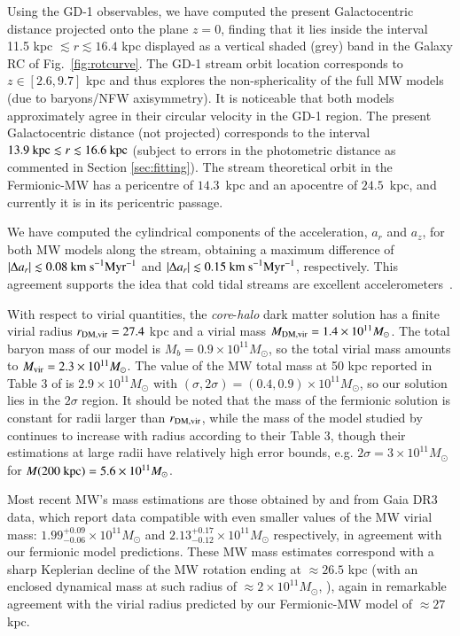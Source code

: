 \documentclass[twocolumn]{aa}
\begin{document}
Using the GD-1 observables, we have computed the present Galactocentric distance projected onto the plane $z=0$, finding that it lies inside the interval 11.5 kpc $\lesssim r \lesssim 16.4$ kpc displayed as a vertical shaded (grey) band in the Galaxy RC of Fig.~\ref{fig:rotcurve}. The GD-1 stream orbit location corresponds to $z\in [2.6, 9.7]$ kpc and thus explores the non-sphericality of the full MW models (due to baryons/NFW axisymmetry).
It is noticeable that both models approximately agree in their circular velocity in the GD-1 region.
The present Galactocentric distance (not projected) corresponds to the interval $13.9~\textrm{kpc} \lesssim r \lesssim 16.6~\rm{kpc}$ (subject to errors in the photometric distance as commented in Section \ref{sec:fitting}). The stream theoretical orbit in the Fermionic-MW has a pericentre of $14.3$~kpc and an apocentre of $24.5$~kpc, and currently it is in its pericentric passage.

We have computed the cylindrical components of the acceleration, $a_r$ and $a_z$,
for both MW models along the stream, obtaining a maximum difference of $|\Delta a_r| \lesssim 0.08 \rm{~km~s}^{-1} \rm{Myr}^{-1}$ and $|\Delta a_r| \lesssim 0.15 \rm{~km~s}^{-1} \rm{Myr}^{-1}$, respectively. This agreement supports  the idea that cold tidal streams are excellent accelerometers~\citep{Ibata_2016,2022ApJ...940...22N,2023ApJ...945L..32C}.

With respect to virial quantities, the \textit{core}-\textit{halo} dark matter solution has a finite virial radius $r_{\rm{DM,vir}}=27.4$ kpc and a virial mass
$M_{\rm{DM,vir}}=1.4\times10^{11} M_\odot$. The total baryon mass of our model is $M_b=0.9\times10^{11}M_\odot$, so the total virial mass amounts to
$M_{\rm{vir}}=2.3\times10^{11} M_\odot$. The value of the MW total mass at 50 kpc reported in Table 3
of \citet{2014MNRAS.445.3788G} is $2.9\times10^{11} M_\odot$ with $(\sigma, 2\sigma)=(0.4,0.9)\times10^{11} M_\odot$, so our solution lies in the $2\sigma$ region.
It should be noted that the mass of the fermionic solution is constant for radii larger than
$r_{\rm{DM,vir}}$, while the mass of the model studied by \citet{2014MNRAS.445.3788G} continues to increase with radius according to their Table 3, though their estimations at large radii have relatively
high error bounds, e.g. $2\sigma=3\times10^{11} M_\odot$ for $M(200 \hbox{ kpc}) =5.6\times10^{11} M_\odot$.

Most recent MW's mass estimations are those obtained by
\citet{Jiao2023} and \citet{Ou2023} from Gaia DR3 data, which report data compatible with even smaller values of the MW virial mass: $1.99^{+0.09}_{-0.06}\times10^{11} M_\odot$ and $2.13^{+0.17}_{-0.12}\times10^{11} M_\odot$ respectively, in agreement with our fermionic model predictions. These MW mass estimates correspond with a sharp Keplerian decline of the MW rotation ending at $\approx 26.5$ kpc (with an enclosed dynamical mass at such radius of $\approx 2\times 10^{11} M_\odot$, \citealp{Jiao2023}), again in remarkable agreement with the virial radius predicted by our Fermionic-MW model of $\approx 27$ kpc.
\end{document}
